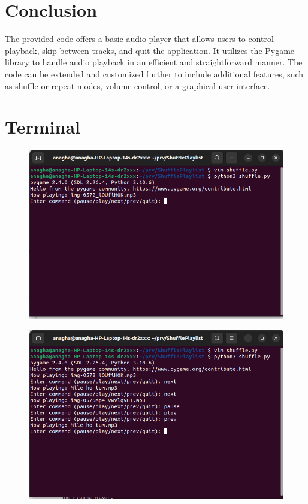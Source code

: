 \documentclass{article}
\begin{document}
\section{Conclusion}
The provided code offers a basic audio player that allows users to control playback, skip between tracks, and quit the application. It utilizes the Pygame library to handle audio playback in an efficient and straightforward manner. The code can be extended and customized further to include additional features, such as shuffle or repeat modes, volume control, or a graphical user interface.

\section{Terminal}

\begin{figure}[ht]
        \centering
        \includegraphics[width=0.8\linewidth]{terminal1.png}
        \caption{}
        \label{fig:view}
\end{figure}

\begin{figure}[ht]
        \centering
        \includegraphics[width=0.8\linewidth]{terminal2.png}
        \caption{}
        \label{fig:view}
\end{figure}
\end{document}
